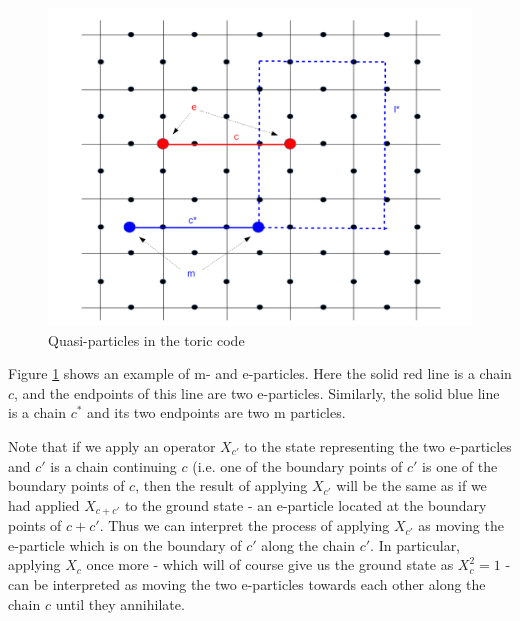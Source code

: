 \documentclass[a4paper, draft]{article}
\theoremstyle{own}
\theoremstyle{remark}
\begin{document}
\begin{figure}[ht]
\centering
\includegraphics[width=0.7\linewidth]{images/Anyons}
\caption[Quasi-particles in the toric code]{Quasi-particles in the toric code}
\label{fig:Anyons}
\end{figure}
 
Figure \ref{fig:Anyons} shows an example of m- and e-particles. Here the solid red line is a chain $c$, and the endpoints of this line are two e-particles. Similarly, the solid blue line is a chain $c^*$ and its two endpoints are two m particles. 

Note that if we apply an operator $X_{c'}$ to the state representing the two e-particles and $c'$ is a chain continuing $c$ (i.e. one of the boundary points of $c'$ is one of the boundary points of $c$, then the result of applying $X_{c'}$ will be the same as if we had applied $X_{c+c'}$ to the ground state - an e-particle located at the boundary points of $c + c'$. Thus we can interpret the process of applying $X_{c'}$ as moving the e-particle which is on the boundary of $c'$ along the chain $c'$. In particular, applying $X_c$ once more - which will of course give us the ground state as $X_c^2 = 1$ - can be interpreted as moving the two e-particles towards each other along the chain $c$ until they annihilate. 
\end{document}
